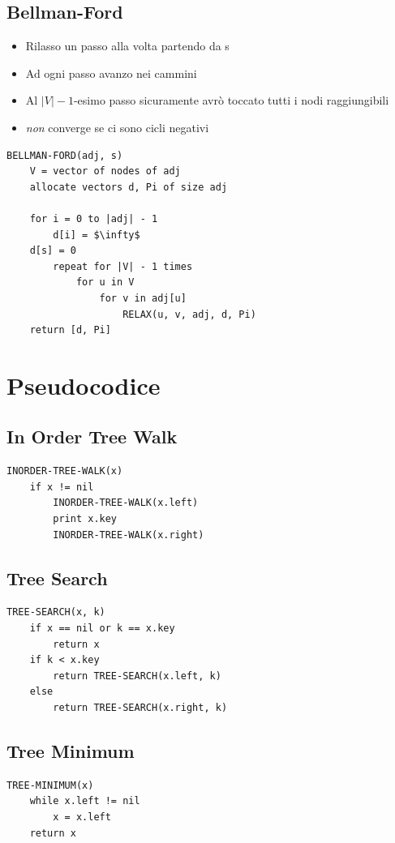\documentclass[10pt,a4paper]{article}
\begin{document}
\begin{multicols*}{2}
\subsection*{Bellman-Ford}
\begin{itemize}
    \item Rilasso un passo alla volta partendo da s
    \item Ad ogni passo avanzo nei cammini
    \item Al $|V| - 1$-esimo passo sicuramente avrò toccato tutti i nodi raggiungibili
    \item \emph{non} converge se ci sono cicli negativi
\end{itemize}
\begin{lstlisting}
BELLMAN-FORD(adj, s)
    V = vector of nodes of adj
    allocate vectors d, Pi of size adj

    for i = 0 to |adj| - 1
        d[i] = $\infty$
    d[s] = 0
        repeat for |V| - 1 times
            for u in V
                for v in adj[u]
                    RELAX(u, v, adj, d, Pi)
    return [d, Pi]
\end{lstlisting}

\section*{Pseudocodice}

\subsection*{In Order Tree Walk}
\begin{lstlisting}
INORDER-TREE-WALK(x)
    if x != nil
        INORDER-TREE-WALK(x.left)
        print x.key
        INORDER-TREE-WALK(x.right)
\end{lstlisting}
\subsection*{Tree Search}
\begin{lstlisting}
TREE-SEARCH(x, k)
    if x == nil or k == x.key
        return x
    if k < x.key
        return TREE-SEARCH(x.left, k)
    else
        return TREE-SEARCH(x.right, k)
\end{lstlisting}
\subsection*{Tree Minimum}
\begin{lstlisting}
TREE-MINIMUM(x)
    while x.left != nil
        x = x.left
    return x
\end{lstlisting}

\end{multicols*}
\end{document}
